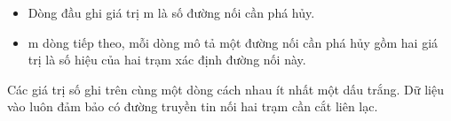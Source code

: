 \begin{itemize}
	\item     Dòng đầu ghi giá trị m là số đường nối cần phá hủy.   
	\item     m dòng tiếp theo, mỗi dòng mô tả một đường nối cần phá hủy gồm hai giá trị là số hiệu của hai trạm xác định đường nối này.   
\end{itemize}

   Các giá trị số ghi trên cùng một dòng cách nhau ít nhất một dấu trắng. Dữ liệu vào luôn đảm bảo có đường truyền tin nối hai trạm cần cắt liên lạc.  

\